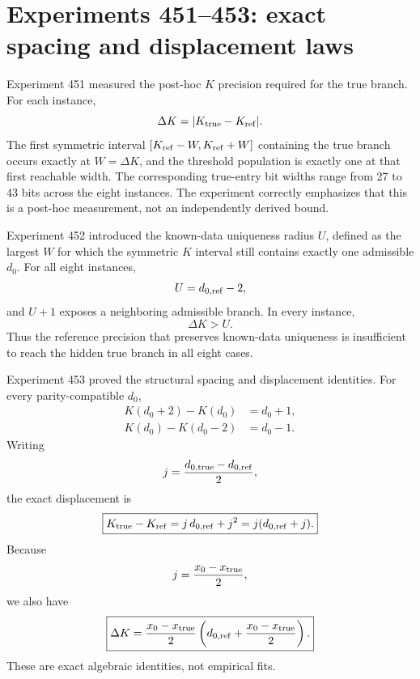 \documentclass[11pt,a4paper]{article}
\begin{document}
\section{Experiments 451--453: exact spacing and displacement laws}

Experiment 451 measured the post-hoc $K$ precision required for the true branch. For each instance,
\begin{equation}
\Delta K=|K_{\rm true}-K_{\rm ref}|.
\end{equation}
The first symmetric interval $[K_{\rm ref}-W,K_{\rm ref}+W]$ containing the true branch occurs exactly at $W=\Delta K$, and the threshold population is exactly one at that first reachable width. The corresponding true-entry bit widths range from 27 to 43 bits across the eight instances. The experiment correctly emphasizes that this is a post-hoc measurement, not an independently derived bound.

Experiment 452 introduced the known-data uniqueness radius $U$, defined as the largest $W$ for which the symmetric $K$ interval still contains exactly one admissible $d_0$. For all eight instances,
\begin{equation}
U=d_{0,\rm ref}-2,
\end{equation}
and $U+1$ exposes a neighboring admissible branch. In every instance,
\begin{equation}
\Delta K>U.
\end{equation}
Thus the reference precision that preserves known-data uniqueness is insufficient to reach the hidden true branch in all eight cases.

Experiment 453 proved the structural spacing and displacement identities. For every parity-compatible $d_0$,
\begin{align}
K(d_0+2)-K(d_0)&=d_0+1,\\
K(d_0)-K(d_0-2)&=d_0-1.
\end{align}
Writing
\begin{equation}
j=\frac{d_{0,\rm true}-d_{0,\rm ref}}{2},
\end{equation}
the exact displacement is
\begin{equation}
\boxed{K_{\rm true}-K_{\rm ref}=j\,d_{0,\rm ref}+j^2=j(d_{0,\rm ref}+j).}
\end{equation}
Because
\begin{equation}
j=\frac{x_0-x_{\rm true}}2,
\end{equation}
we also have
\begin{equation}
\boxed{
\Delta K
=\frac{x_0-x_{\rm true}}2
\left(d_{0,\rm ref}+\frac{x_0-x_{\rm true}}2\right).
}
\end{equation}
These are exact algebraic identities, not empirical fits.
\end{document}
